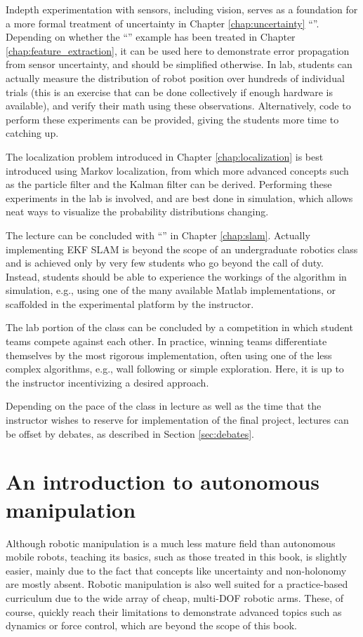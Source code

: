 \documentclass[paper=6.14in:9.21in,pagesize=pdftex,11pt,twoside,openright]{scrbook}
\begin{document}
Indepth experimentation with sensors, including vision, serves as a foundation for a more formal treatment of uncertainty in Chapter \ref{chap:uncertainty} ``''. Depending on whether the ``'' example has been treated in Chapter \ref{chap:feature_extraction}, it can be used here to demonstrate error propagation from sensor uncertainty, and should be simplified otherwise. In lab, students can actually measure the distribution of robot position over hundreds of individual trials (this is an exercise that can be done collectively if enough hardware is available), and verify their math using these observations. Alternatively, code to perform these experiments can be provided, giving the students more time to catching up.

The localization problem introduced in Chapter \ref{chap:localization} is best introduced using Markov localization, from which more advanced concepts such as the particle filter and the Kalman filter can be derived. Performing these experiments in the lab is involved, and are best done in simulation, which allows neat ways to visualize the probability distributions changing.

The lecture can be concluded with ``'' in Chapter \ref{chap:slam}. Actually implementing EKF SLAM is beyond the scope of an undergraduate robotics class and is achieved only by very few students who go beyond the call of duty. Instead, students should be able to experience the workings of the algorithm in simulation, e.g., using one of the many available Matlab implementations, or scaffolded in the experimental platform by the instructor.

The lab portion of the class can be concluded by a competition in which student teams compete against each other. In practice, winning teams differentiate themselves by the most rigorous implementation, often using one of the less complex algorithms, e.g., wall following or simple exploration. Here, it is up to the instructor incentivizing a desired approach.

Depending on the pace of the class in lecture as well as the time that the instructor wishes to reserve for implementation of the final project, lectures can be offset by debates, as described in Section \ref{sec:debates}.

\section{An introduction to autonomous manipulation}
Although robotic manipulation is a much less mature field than autonomous mobile robots, teaching its basics, such as those treated in this book, is slightly easier, mainly due to the fact that concepts like uncertainty and non-holonomy are mostly absent. Robotic manipulation is also well suited for a practice-based curriculum due to the wide array of cheap, multi-DOF robotic arms. These, of course, quickly reach their limitations to demonstrate advanced topics such as dynamics or force control, which are beyond the scope of this book.
\end{document}
